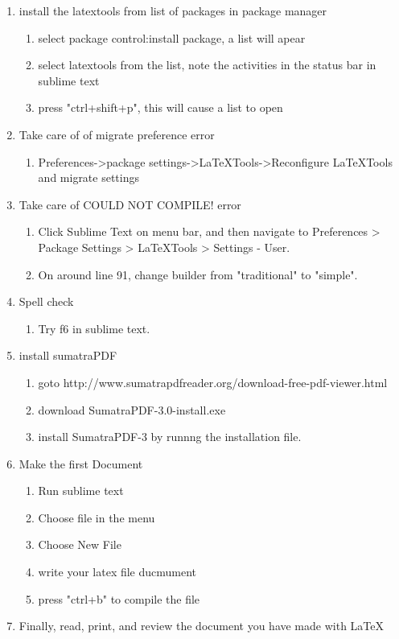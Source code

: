 \documentclass{memoir}
\begin{document}
\begin{enumerate}
  \item install the latextools from list of packages in package manager
  \begin{enumerate}
    \item select package control:install package, a list will apear
    \item select latextools from the list, note the activities in the status bar in sublime text
    \item press "ctrl+shift+p", this will cause a list to open
  \end{enumerate}  
 

  \item Take care of of migrate preference error
  \begin{enumerate}
    \item Preferences->package settings->LaTeXTools->Reconfigure LaTeXTools and migrate settings
  \end{enumerate} 

  \item  Take care of COULD NOT COMPILE! error

  \begin{enumerate}
    \item  Click Sublime Text on menu bar, and then navigate to Preferences > Package Settings > LaTeXTools > Settings - User.
    \item  On around line 91, change builder from "traditional" to "simple".
  \end{enumerate} 


  \item  Spell check 
  \begin{enumerate}
    \item  Try f6 in sublime text.
  \end{enumerate} 

  \item install sumatraPDF
  \begin{enumerate}
    \item goto http://www.sumatrapdfreader.org/download-free-pdf-viewer.html
    \item download SumatraPDF-3.0-install.exe
    \item install SumatraPDF-3 by runnng the installation file.
  \end{enumerate}



  \item Make the first Document
  \begin{enumerate}
    \item Run sublime text
    \item Choose file in the menu 
    \item Choose New File
    \item write your latex file ducmument
    \item press "ctrl+b" to compile the file
  \end{enumerate}
  
  \item Finally, read, print, and review the document you have made with \LaTeX
\end{enumerate}
\end{document}
